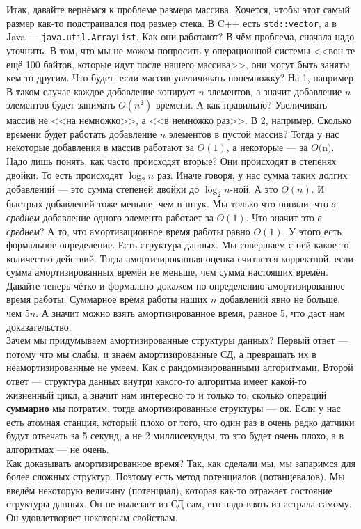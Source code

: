 \documentclass{article}
\newcommand{\pseudo}{PseudoLexer.py:PseudoLexer -x}
\newcommand{\pseudocode}[1]{\texttt{#1}}
\begin{document}
    Итак, давайте вернёмся к проблеме размера массива. Хочется, чтобы этот самый размер как-то подстраивался под размер стека. В C++ есть \texttt{std::vector}, а в Java --- \texttt{java.util.ArrayList}. Как они работают? В чём проблема, сначала надо уточнить. В том, что мы не можем попросить у операционной системы <<вон те ещё 100 байтов, которые идут после нашего массива>>, они могут быть заняты кем-то другим. Что будет, если массив увеличивать понемножку? На 1, например. В таком случае каждое добавление копирует $n$ элементов, а значит добавление $n$ элементов будет занимать $O(n^2)$ времени. А как правильно? Увеличивать массив не <<на немножко>>, а <<в немножко раз>>. В 2, например. Сколько времени будет работать добавление $n$ элементов в пустой массив? Тогда у нас некоторые добавления в массив работают за $O(1)$, а некоторые --- за $O($n$)$. Надо лишь понять, как часто происходят вторые? Они происходят в степенях двойки. То есть происходят $\log_2n$ раз. Иначе говоря, у нас сумма таких долгих добавлений --- это сумма степеней двойки до $\log_2n$-ной. А это $O(n)$. И быстрых добавлений тоже меньше, чем \pseudocode{n} штук. Мы только что поняли, что \textit{в среднем} добавление одного элемента работает за $O(1)$. Что значит это \textit{в среднем}? А то, что амортизационное время работы равно $O(1)$. У этого есть формальное определение. Есть структура данных. Мы совершаем с ней какое-то количество действий. Тогда амортизированная оценка считается корректной, если сумма амортизированных времён не меньше, чем сумма настоящих времён. Давайте теперь чётко и формально докажем по определению амортизированное время работы. Суммарное время работы наших $n$ добавлений явно не больше, чем $5n$. А значит можно взять амортизированное время, равное 5, что даст нам доказательство.\\
    Зачем мы придумываем амортизированные структуры данных? Первый ответ --- потому что мы слабы, и знаем амортизированные СД, а превращать их в неамортизированные не умеем. Как с рандомизированными алгоритмами. Второй ответ --- структура данных внутри какого-то алгоритма имеет какой-то жизненный цикл, а значит нам интересно то и только то, сколько операций \textbf{суммарно} мы потратим, тогда амортизированные структуры --- ок. Если у нас есть атомная станция, который плохо от того, что один раз в очень редко датчики будут отвечать за 5 секунд, а не 2 миллисекунды, то это будет очень плохо, а в алгоритмах --- не очень.\\
    Как доказывать амортизированное время? Так, как сделали мы, мы запаримся для более сложных структур. Поэтому есть метод потенциалов (потанцевалов). Мы введём некоторую величину (потенциал), которая как-то отражает состояние структуры данных. Он не вылезает из СД сам, его надо взять из астрала самому. Он удовлетворяет некоторым свойствам.
\end{document}
